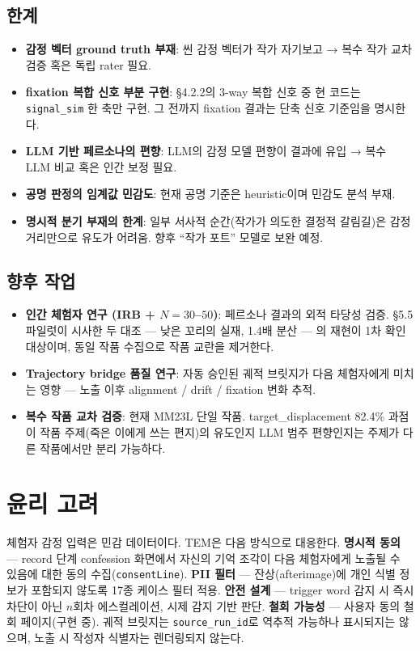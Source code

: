 \documentclass[11pt, a4paper]{article}
\begin{document}
\subsection{한계}
\begin{itemize}
  \item \textbf{감정 벡터 ground truth 부재}: 씬 감정 벡터가 작가 자기보고 → 복수 작가 교차 검증 혹은 독립 rater 필요.
  \item \textbf{fixation 복합 신호 부분 구현}: \S4.2.2의 3-way 복합 신호 중 현 코드는 \texttt{signal\_sim} 한 축만 구현. 그 전까지 fixation 결과는 단축 신호 기준임을 명시한다.
  \item \textbf{LLM 기반 페르소나의 편향}: LLM의 감정 모델 편향이 결과에 유입 → 복수 LLM 비교 혹은 인간 보정 필요.
  \item \textbf{공명 판정의 임계값 민감도}: 현재 공명 기준은 heuristic이며 민감도 분석 부재.
  \item \textbf{명시적 분기 부재의 한계}: 일부 서사적 순간(작가가 의도한 결정적 갈림길)은 감정 거리만으로 유도가 어려움. 향후 ``작가 포트'' 모델로 보완 예정.
\end{itemize}

\subsection{향후 작업}
\begin{itemize}
  \item \textbf{인간 체험자 연구 (IRB + $N=30$--$50$)}: 페르소나 결과의 외적 타당성 검증. \S5.5 파일럿이 시사한 두 대조 --- 낮은 꼬리의 실재, 1.4배 분산 --- 의 재현이 1차 확인 대상이며, 동일 작품 수집으로 작품 교란을 제거한다.
  \item \textbf{Trajectory bridge 품질 연구}: 자동 승인된 궤적 브릿지가 다음 체험자에게 미치는 영향 --- 노출 이후 alignment / drift / fixation 변화 추적.
  \item \textbf{복수 작품 교차 검증}: 현재 MM23L 단일 작품. target\_displacement 82.4\% 과점이 작품 주제(죽은 이에게 쓰는 편지)의 유도인지 LLM 범주 편향인지는 주제가 다른 작품에서만 분리 가능하다.
\end{itemize}

\section{윤리 고려}
체험자 감정 입력은 민감 데이터이다. TEM은 다음 방식으로 대응한다. \textbf{명시적 동의} --- record 단계 confession 화면에서 자신의 기억 조각이 다음 체험자에게 노출될 수 있음에 대한 동의 수집(\texttt{consentLine}). \textbf{PII 필터} --- 잔상(afterimage)에 개인 식별 정보가 포함되지 않도록 17종 케이스 필터 적용. \textbf{안전 설계} --- trigger word 감지 시 즉시 차단이 아닌 $n$회차 에스컬레이션, 시제 감지 기반 판단. \textbf{철회 가능성} --- 사용자 동의 철회 페이지(구현 중). 궤적 브릿지는 \texttt{source\_run\_id}로 역추적 가능하나 표시되지는 않으며, 노출 시 작성자 식별자는 렌더링되지 않는다.
\end{document}
